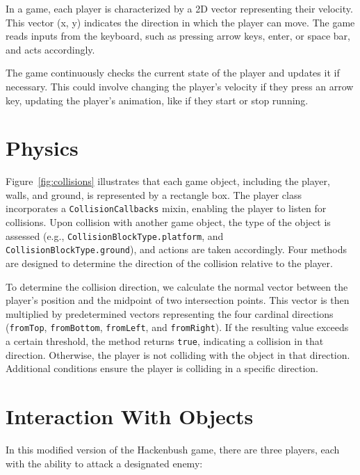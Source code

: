 \documentclass[12pt,a4paper,hidelinks]{report}
\begin{document}
In a game, each player is characterized by a 2D vector representing their velocity. This vector (x, y) indicates the direction in which the player can move. The game reads inputs from the keyboard, such as pressing arrow keys, enter, or space bar, and acts accordingly.
\par
The game continuously checks the current state of the player and updates it if necessary. This could involve changing the player's velocity if they press an arrow key, updating the player's animation, like if they start or stop running.

\section{Physics}

Figure~\ref{fig:collisions} illustrates that each game object, including the player, walls, and ground, is represented by a rectangle box. The player class incorporates a \verb|CollisionCallbacks| mixin, enabling the player to listen for collisions. Upon collision with another game object, the type of the object is assessed (e.g., \verb|CollisionBlockType.platform|, and \verb|CollisionBlockType.ground|), and actions are taken accordingly. Four methods are designed to determine the direction of the collision relative to the player.
\par
To determine the collision direction, we calculate the normal vector between the player's position and the midpoint of two intersection points. This vector is then multiplied by predetermined vectors representing the four cardinal directions (\verb|fromTop|, \verb|fromBottom|, \verb|fromLeft|, and \verb|fromRight|). If the resulting value exceeds a certain threshold, the method returns \verb|true|, indicating a collision in that direction. Otherwise, the player is not colliding with the object in that direction. Additional conditions ensure the player is colliding in a specific direction.

\section{Interaction With Objects}

In this modified version of the Hackenbush game, there are three players, each with the ability to attack a designated enemy:
\end{document}
